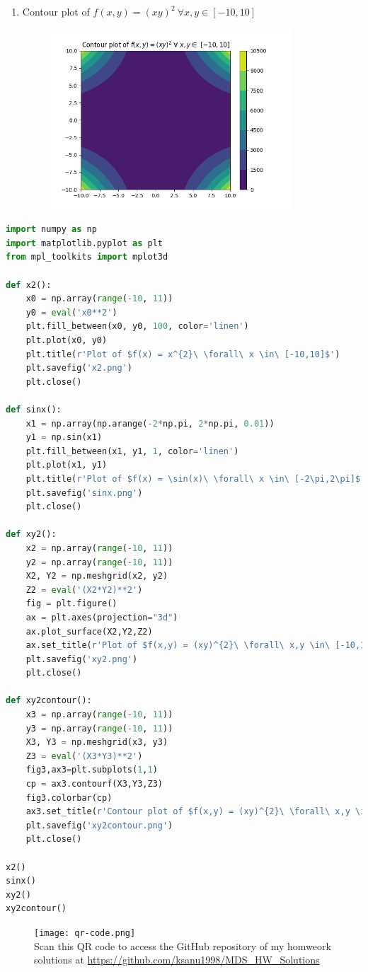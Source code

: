 \documentclass{article}
\begin{document}
\begin{flushleft}
\begin{enumerate}
\begin{figure}[htp]
	\end{figure}
	\item Contour plot of $f(x,y)=(xy)^{2}\   \forall x,y \in[-10,10]$
	\begin{figure}[htp]
		\centering
		\includegraphics[width=9cm]{xy2contour.png}
	\end{figure}
\end{enumerate}
\clearpage
\begin{lstlisting}[language=Python, title={Python code to generate the plots in \textbf{Solution 4}}]
import numpy as np  
import matplotlib.pyplot as plt  
from mpl_toolkits import mplot3d

def x2():
    x0 = np.array(range(-10, 11))
    y0 = eval('x0**2')
    plt.fill_between(x0, y0, 100, color='linen')
    plt.plot(x0, y0)
    plt.title(r'Plot of $f(x) = x^{2}\ \forall\ x \in\ [-10,10]$')
    plt.savefig('x2.png')
    plt.close()

def sinx():
    x1 = np.array(np.arange(-2*np.pi, 2*np.pi, 0.01))
    y1 = np.sin(x1)
    plt.fill_between(x1, y1, 1, color='linen')
    plt.plot(x1, y1)
    plt.title(r'Plot of $f(x) = \sin(x)\ \forall\ x \in\ [-2\pi,2\pi]$')
    plt.savefig('sinx.png')
    plt.close()

def xy2():
    x2 = np.array(range(-10, 11))
    y2 = np.array(range(-10, 11))
    X2, Y2 = np.meshgrid(x2, y2)
    Z2 = eval('(X2*Y2)**2')
    fig = plt.figure()
    ax = plt.axes(projection="3d")
    ax.plot_surface(X2,Y2,Z2)
    ax.set_title(r'Plot of $f(x,y) = (xy)^{2}\ \forall\ x,y \in\ [-10,10]$')
    plt.savefig('xy2.png')
    plt.close()

def xy2contour():
    x3 = np.array(range(-10, 11))
    y3 = np.array(range(-10, 11))
    X3, Y3 = np.meshgrid(x3, y3)
    Z3 = eval('(X3*Y3)**2')
    fig3,ax3=plt.subplots(1,1)
    cp = ax3.contourf(X3,Y3,Z3)
    fig3.colorbar(cp)
    ax3.set_title(r'Contour plot of $f(x,y) = (xy)^{2}\ \forall\ x,y \in\ [-10,10]$')
    plt.savefig('xy2contour.png')
    plt.close()

x2()
sinx()
xy2()
xy2contour()
\end{lstlisting}
\clearpage
\begin{figure}[htp]
        \centering
        \texttt{[image: qr-code.png]}\\
        Scan this QR code to access the GitHub repository of my homweork solutions at \href{https://github.com/ksanu1998/MDS_HW_Solutions}{https://github.com/ksanu1998/MDS\_HW\_Solutions}

\end{figure}
\end{flushleft}
\end{document}
